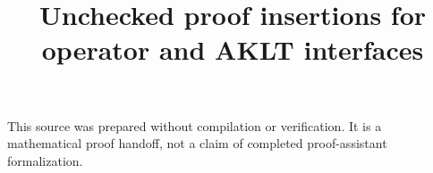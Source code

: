\documentclass[11pt]{article}
\title{Unchecked proof insertions for operator and AKLT interfaces}
\author{}\date{}
\theoremstyle{remark}\newtheorem{remark}[theorem]{Remark}
\begin{document}
\maketitle
\noindent This source was prepared without compilation or verification. It is a mathematical proof handoff, not a claim of completed proof-assistant formalization.




\end{document}
